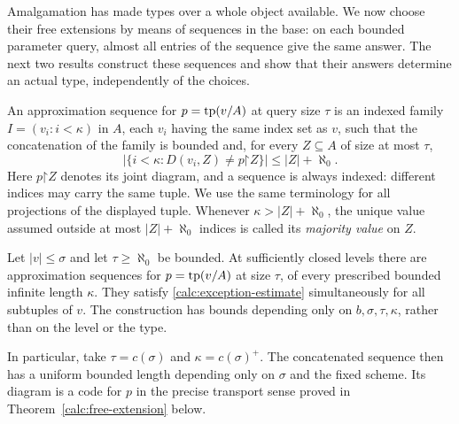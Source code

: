 Amalgamation has made types over a whole object available.  We now choose
their free extensions by means of sequences in the base: on each bounded
parameter query, almost all entries of the sequence give the same answer.
The next two results construct these sequences and show that their answers
determine an actual type, independently of the choices.

\begin{definition}
An approximation sequence for $p=\operatorname{tp}(v/A)$ at query size $\tau$ is an
indexed family $I=(v_i:i<\kappa)$ in $A$, each $v_i$ having the same
index set as $v$, such that the concatenation of the family is bounded
and, for every $Z\subseteq A$ of size at most $\tau$,
\begin{equation}
\label{calc:exception-estimate}
 \bigl|\{i<\kappa:D(v_i,Z)\ne p\mathord\upharpoonright Z\}\bigr|
 \le |Z|+\aleph_0.
\end{equation}
Here $p\mathord\upharpoonright Z$ denotes its joint diagram, and a
sequence is always indexed: different indices may carry the same tuple.
We use the same terminology for all projections of the displayed tuple.
Whenever $\kappa>|Z|+\aleph_0$, the unique value assumed outside at most
$|Z|+\aleph_0$ indices is called its \emph{majority value} on $Z$.
\end{definition}

\begin{lemma}
\label{calc:approximations}
Let $|v|\le\sigma$ and let $\tau\ge\aleph_0$ be bounded.  At
sufficiently closed levels there are approximation sequences for
$p=\operatorname{tp}(v/A)$ at size $\tau$, of every prescribed bounded infinite length
$\kappa$.  They satisfy \eqref{calc:exception-estimate} simultaneously
for all subtuples of $v$.  The construction has bounds depending only
on $b,\sigma,\tau,\kappa$, rather than on the level or the type.

In particular, take $\tau=c(\sigma)$ and
$\kappa=c(\sigma)^+$.  The concatenated sequence then has a uniform
bounded length depending only on $\sigma$ and the fixed scheme.  Its
diagram is a code for $p$ in the precise transport sense proved in
Theorem~\ref{calc:free-extension} below.
\end{lemma}

